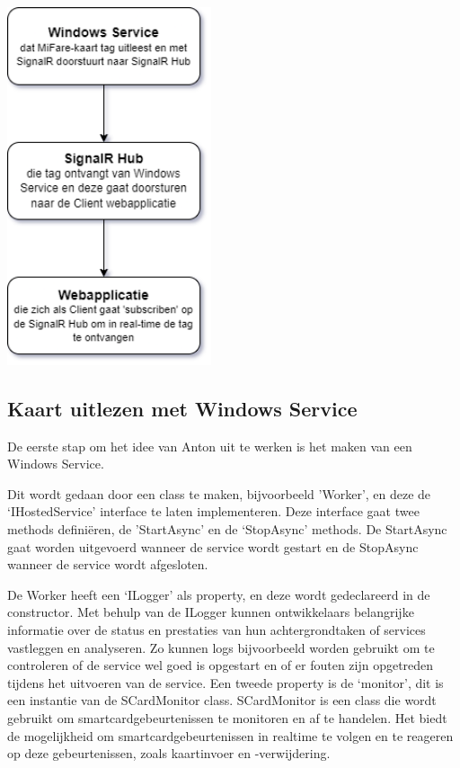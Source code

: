 \begin{center}
    \includegraphics[width=6cm]{BP_voorbeeld_schema}
\end{center}

\subsection{Kaart uitlezen met Windows Service}
De eerste stap om het idee van Anton uit te werken is het maken van een Windows Service.  

Dit wordt gedaan door een class te maken, bijvoorbeeld 'Worker’, en deze de ‘IHostedService’ interface te laten implementeren. Deze interface gaat twee methods definiëren, de 'StartAsync’ en de ‘StopAsync’ methods. De StartAsync gaat worden uitgevoerd wanneer de service wordt gestart en de StopAsync wanneer de service wordt afgesloten.  

De Worker heeft een ‘ILogger’ als property, en deze wordt gedeclareerd in de constructor. Met behulp van de ILogger kunnen ontwikkelaars belangrijke informatie over de status en prestaties van hun achtergrondtaken of services vastleggen en analyseren. Zo kunnen logs bijvoorbeeld worden gebruikt om te controleren of de service wel goed is opgestart en of er fouten zijn opgetreden tijdens het uitvoeren van de service. Een tweede property is de ‘monitor’, dit is een instantie van de SCardMonitor class.  SCardMonitor is een class die wordt gebruikt om smartcardgebeurtenissen te monitoren en af te handelen. Het biedt de mogelijkheid om smartcardgebeurtenissen in realtime te volgen en te reageren op deze gebeurtenissen, zoals kaartinvoer en -verwijdering.

